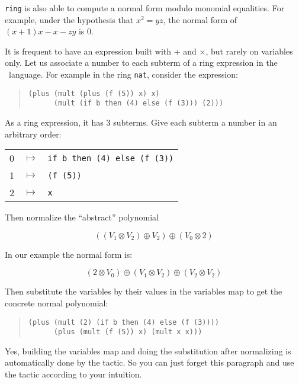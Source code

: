 \texttt{ring} is also able to compute a normal form modulo monomial 
equalities. For example, under the hypothesis that $x^2 = yz$,
 the normal form of $(x + 1)x - x - zy$ is 0.


It is frequent to have an expression built with + and
  $\times$, but rarely on variables only.
Let us associate a number to each subterm of a ring
expression in the \gallina\ language. For example in the ring
\texttt{nat}, consider the expression:

\begin{quotation}
\begin{verbatim}
(plus (mult (plus (f (5)) x) x)
      (mult (if b then (4) else (f (3))) (2)))
\end{verbatim}
\end{quotation}

\noindent As a ring expression, it has 3 subterms. Give each subterm a
number in an arbitrary order:

\begin{tabular}{ccl}
0 & $\mapsto$ & \verb|if b then (4) else (f (3))| \\
1 & $\mapsto$ & \verb|(f (5))| \\
2 & $\mapsto$ & \verb|x| \\
\end{tabular}

\noindent Then normalize the ``abstract'' polynomial 

$$((V_1 \otimes V_2) \oplus V_2) \oplus (V_0 \otimes 2) $$

\noindent In our example the normal form is:

$$(2 \otimes V_0) \oplus (V_1 \otimes V_2) \oplus (V_2 \otimes V_2)$$

\noindent Then substitute the variables by their values in the variables map to
get the concrete normal polynomial:

\begin{quotation}
\begin{verbatim}
(plus (mult (2) (if b then (4) else (f (3)))) 
      (plus (mult (f (5)) x) (mult x x))) 
\end{verbatim}
\end{quotation}


Yes, building the variables map and doing the substitution after
normalizing is automatically done by the tactic. So you can just forget
this paragraph and use the tactic according to your intuition.

